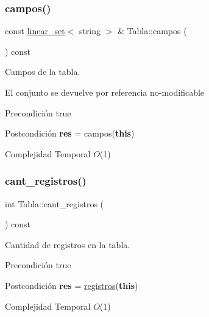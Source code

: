 \subsubsection{\texorpdfstring{campos()}{campos()}}
{\footnotesize\ttfamily const \mbox{\hyperlink{classlinear__set}{linear\+\_\+set}}$<$ string $>$ \& Tabla\+::campos (\begin{DoxyParamCaption}{ }\end{DoxyParamCaption}) const}



Campos de la tabla. 

El conjunto se devuelve por referencia no-\/modificable

\begin{DoxyPrecond}{Precondición}
true 
\end{DoxyPrecond}
\begin{DoxyPostcond}{Postcondición}
{\bfseries res} = campos({\bfseries this})
\end{DoxyPostcond}

\begin{DoxyDescription}
\item[Complejidad Temporal]$O$(1)
\end{DoxyDescription}\mbox{\label{classTabla_a89ec62f42350f3b40bb1d578b4934fc6}} 
\subsubsection{\texorpdfstring{cant\+\_\+registros()}{cant\_registros()}}
{\footnotesize\ttfamily int Tabla\+::cant\+\_\+registros (\begin{DoxyParamCaption}{ }\end{DoxyParamCaption}) const}



Cantidad de registros en la tabla. 

\begin{DoxyPrecond}{Precondición}
true 
\end{DoxyPrecond}
\begin{DoxyPostcond}{Postcondición}
{\bfseries res} = \mbox{\hyperlink{classTabla_a11b94420ed8fa905471a34b41a5191ad}{registros}}({\bfseries this})
\end{DoxyPostcond}

\begin{DoxyDescription}
\item[Complejidad Temporal]$O$(1)
\end{DoxyDescription}\mbox{\label{classTabla_a9b75ecc34187bd3aaec51f610c961d33}} 

